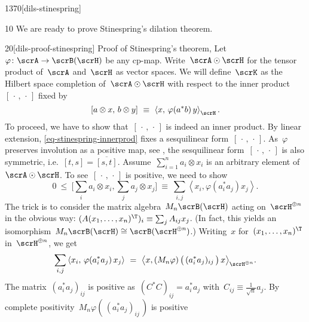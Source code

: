 \begin{parsec}{1370}[dils-stinespring]%
\begin{point}{10}%
We are ready to prove Stinespring's dilation theorem.
\begin{point}{20}[dils-proof-stinespring]{%
    Proof of Stinespring's theorem, }%
Let~$\varphi\colon \scrA \to \scrB(\scrH)$
    be any cp-map.
Write~$\scrA \odot \scrH$ for the tensor product of~$\scrA$ and~$\scrH$
    as vector spaces.
We will define~$\scrK$ as the Hilbert space completion
    of~$\scrA \odot \scrH$ with respect to the inner
    product~$[\,\cdot\,,\,\cdot\,]$
    fixed by
\begin{equation}\label{eq-stinespring-innerprod}
    [a\otimes x,\, b \otimes y] \ \equiv\  \left<x, \,\varphi(a^*b)\, y\right>_{\scrH}.
\end{equation}
To proceed, we have to show that~$[\,\cdot\,,\,\cdot\,]$
    is indeed an inner product.
By linear extension, \eqref{eq-stinespring-innerprod}
    fixes a sesquilinear form~$[\,\cdot\,,\,\cdot\,]$.
As~$\varphi$ preserves involution as a positive map,
see ,
    the sesquilinear form~$[\,\cdot\,,\,\cdot\,]$
is also symmetric, i.e.~$[t,s]=\overline{[s,t]}$.
    Assume~$\sum^n_{i=1} a_i\otimes x_i$
is an arbitrary element of~$\scrA \odot \scrH$.
To see~$[\,\cdot\,,\,\cdot\,]$ is positive,
we need to show
\begin{equation*}
    0 \ \leq\  \bigl[\sum_i a_i\otimes x_i, \sum_j a_j\otimes x_j\bigr]
        \ \equiv\  \sum_{i,j} \left< x_i, \varphi(a_i^*a_j) x_j \right>.
\end{equation*}
The trick is to consider the matrix algebra~$M_n\scrB(\scrH)$
acting on~$\scrH^{\oplus n}$ in the obvious way:
$(A (x_1,\ldots,x_n)^\T)_i \equiv \sum_j A_{ij} x_j$.
(In fact, this yields an
    isomorphism~$M_n\scrB(\scrH) \cong \scrB(\scrH^{\oplus n})$.)
Writing~$x$ for~$(x_1,\ldots,x_n)^\T$ in~$\scrH^{\oplus n}$,
    we get
\begin{equation}\label{eq-stinespring-norm-tensor}
    \sum_{i,j} \left< x_i, \,\varphi(a_i^*a_j)\, x_j \right>
    \ =\  \bigl<
    x,
    (M_n\varphi) \,\bigl(\, (a_i^*a_j)_{ij} \, \bigr)\,
    x \bigr>_{\scrH^{\oplus n}}.
\end{equation}
The matrix~$(a_i^*a_j)_{ij}$
is positive as~$(C^*C)_{ij} = a_i^*a_j$
    with~$C_{ij} \equiv \frac{1}{\sqrt{n}} a_j$.
    By complete positivity~$M_n\varphi(\,(a_i^*a_j)_{ij}\,)$ is positive

\end{point}
\end{point}
\end{parsec}
